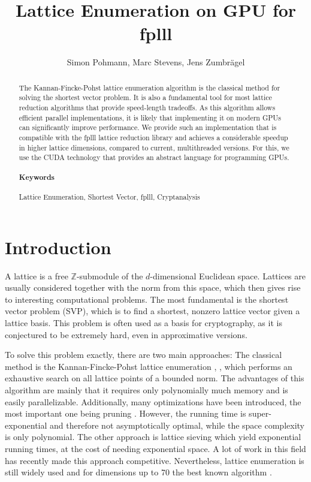\documentclass{scrartcl}
\title{Lattice Enumeration on GPU for fplll}
\author{Simon Pohmann, Marc Stevens, Jens Zumbrägel}
\newcommand{\Z}{\mathbb{Z}}
\begin{document}
    \maketitle
    
    \begin{abstract}
    The Kannan-Fincke-Pohst lattice enumeration algorithm is the classical method for solving the shortest vector problem. It is also a fundamental tool for most lattice reduction algorithms that provide speed-length tradeoffs. 
    As this algorithm allows efficient parallel implementations, it is likely that implementing it on modern GPUs can significantly improve performance. 
    We provide such an implementation that is compatible with the fplll lattice reduction library \cite{fplll} and achieves a considerable speedup in higher lattice dimensions, compared to current, multithreaded versions.
    For this, we use the CUDA technology that provides an abstract language for programming GPUs.
    
    \paragraph{Keywords} Lattice Enumeration, Shortest Vector, fplll, Cryptanalysis
    \end{abstract}

    \section{Introduction}

    A lattice is a free $\Z$-submodule of the $d$-dimensional Euclidean space. Lattices are usually considered together with the norm from this space, which then gives rise to interesting computational problems.
    The most fundamental is the shortest vector problem (SVP), which is to find a shortest, nonzero lattice vector given a lattice basis. 
    This problem is often used as a basis for cryptography, as it is conjectured to be extremely hard, even in approximative versions.

    To solve this problem exactly, there are two main approaches:
    The classical method is the Kannan-Fincke-Pohst lattice enumeration \cite{enum1}, \cite{enum}, which performs an exhaustive search on all lattice points of a bounded norm. The advantages of this algorithm are mainly that it requires only polynomially much memory and is easily parallelizable. Additionally, many optimizations have been introduced, the most important one being pruning \cite{pruning}.
    However, the running time is super-exponential and therefore not asymptotically optimal, while the space complexity is only polynomial.
    The other approach is lattice sieving \cite{sieve} which yield exponential running times, at the cost of needing exponential space. 
    A lot of work in this field has recently made this approach competitive.
    Nevertheless, lattice enumeration is still widely used and for dimensions up to 70 the best known algorithm \cite{g6k}.
\end{document}
